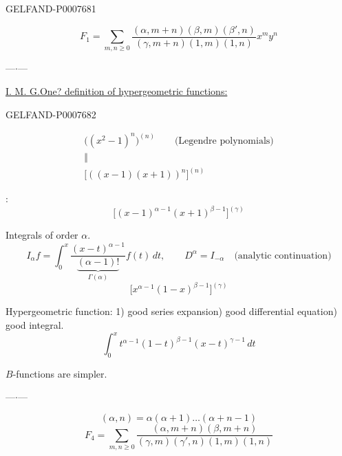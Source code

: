 \begin{GelfandAdjacentEvidence}{GELFAND-P000768}{1}

\begin{equation*}
\tag{1}
F_1=\sum_{m,n\geq 0}
\frac{(\alpha,m+n)(\beta,m)(\beta',n)}
{(\gamma,m+n)(1,m)(1,n)}x^m y^n
\end{equation*}

\begin{center}---\quad\(\cdot\)\quad---\end{center}

\underline{I. M. G.}\quad\underline{One? definition of hypergeometric functions:}
\end{GelfandAdjacentEvidence}
\begin{GelfandAdjacentEvidence}{GELFAND-P000768}{2}

\[
\begin{gathered}
\bigl((x^2-1)^n\bigr)^{(n)}\qquad\text{(Legendre polynomials)}\\
\Vert\\
\bigl[((x-1)(x+1))^n\bigr]^{(n)}
\end{gathered}
\]

:
\[
\bigl[(x-1)^{\alpha-1}(x+1)^{\beta-1}\bigr]^{(\gamma)}
\]

Integrals of order \(\alpha\).
\[
I_\alpha f=\int_0^x\frac{(x-t)^{\alpha-1}}{\underbrace{(\alpha-1)!}_{\Gamma(\alpha)}}f(t)\,dt,
\qquad D^\alpha=I_{-\alpha}\quad\text{(analytic continuation)}
\]
\[
\bigl[x^{\alpha-1}(1-x)^{\beta-1}\bigr]^{(\gamma)}
\]

Hypergeometric function: 1) good series expansion) good differential equation) good integral.
\[
\int_0^x t^{\alpha-1}(1-t)^{\beta-1}(x-t)^{\gamma-1}\,dt
\]

\(B\)-functions are simpler.

\begin{center}---\quad\(\cdot\)\quad---\end{center}

\[
(\alpha,n)=\alpha(\alpha+1)\ldots(\alpha+n-1)
\]
\begin{equation*}
\tag{2}
F_4=\sum_{m,n\geq 0}
\frac{(\alpha,m+n)(\beta,m+n)}
{(\gamma,m)(\gamma',n)(1,m)(1,n)}
\end{equation*}
\end{GelfandAdjacentEvidence}
